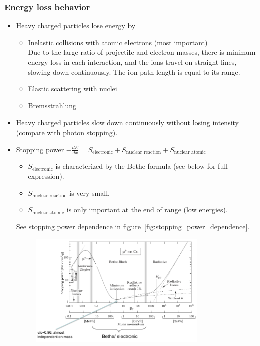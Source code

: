 \subsubsection{Energy loss behavior}
\begin{itemize}
    \item Heavy charged particles lose energy by
    \begin{itemize}
        \item Inelastic collisions with atomic electrons (most important)\\
         Due to the large ratio of projectile and electron masses, there is minimum energy loss in each interaction, and the ions travel on straight lines, slowing down continuously. The ion path length is equal to its range.
        \item Elastic scattering with nuclei
        \item Bremsstrahlung 
    \end{itemize}
    \item Heavy charged particles slow down continuously without losing intensity (compare with photon stopping).
    \item Stopping power $-\frac{dE}{dx}=S_{\text{electronic}}+S_{\text{nuclear reaction}}+S_{\text{nuclear atomic}}$
    \begin{itemize}
        \item $S_{\text{electronic}}$ is characterized by the Bethe formula (see below for full expression).
        \item $S_{\text{nuclear reaction}}$ is very small.
        \item $S_{\text{nuclear atomic}}$ is only important at the end of range (low energies).
    \end{itemize}
    See stopping power dependence in figure~\ref{fig:stopping_power_dependence}.
    \begin{figure}[ht]
        \centering
        \includegraphics[width=0.8\textwidth]{images/stopping_power_dependence.png}

\end{figure}
\end{itemize}
